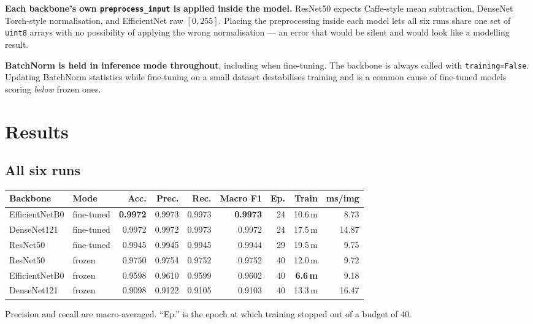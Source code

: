 \documentclass[11pt,a4paper]{article}
\begin{document}
\textbf{Each backbone's own \texttt{preprocess\_input} is applied inside the model.}
ResNet50 expects Caffe-style mean subtraction, DenseNet Torch-style normalisation, and
EfficientNet raw $[0,255]$. Placing the preprocessing inside each model lets all six runs
share one set of \texttt{uint8} arrays with no possibility of applying the wrong
normalisation --- an error that would be silent and would look like a modelling result.

\textbf{BatchNorm is held in inference mode throughout}, including when fine-tuning. The
backbone is always called with \texttt{training=False}. Updating BatchNorm statistics
while fine-tuning on a small dataset destabilises training and is a common cause of
fine-tuned models scoring \emph{below} frozen ones.

\section{Results}

\subsection{All six runs}

\begin{center}
\small
\begin{tabular}{@{}llrrrrrrr@{}}
\toprule
\textbf{Backbone} & \textbf{Mode} & \textbf{Acc.} & \textbf{Prec.} & \textbf{Rec.} &
\textbf{Macro F1} & \textbf{Ep.} & \textbf{Train} & \textbf{ms/img} \\
\midrule
EfficientNetB0 & fine-tuned & \textbf{0.9972} & 0.9973 & 0.9973 & \textbf{0.9973} & 24 & 10.6\,m & 8.73 \\
DenseNet121    & fine-tuned & 0.9972 & 0.9972 & 0.9973 & 0.9972 & 24 & 17.5\,m & 14.87 \\
ResNet50       & fine-tuned & 0.9945 & 0.9945 & 0.9945 & 0.9944 & 29 & 19.5\,m & 9.75 \\
ResNet50       & frozen     & 0.9750 & 0.9754 & 0.9752 & 0.9752 & 40 & 12.0\,m & 9.72 \\
EfficientNetB0 & frozen     & 0.9598 & 0.9610 & 0.9599 & 0.9602 & 40 & \textbf{6.6\,m} & 9.18 \\
DenseNet121    & frozen     & 0.9098 & 0.9122 & 0.9105 & 0.9103 & 40 & 13.3\,m & 16.47 \\
\bottomrule
\end{tabular}
\normalsize
\end{center}

Precision and recall are macro-averaged. ``Ep.'' is the epoch at which training stopped
out of a budget of 40.
\end{document}
